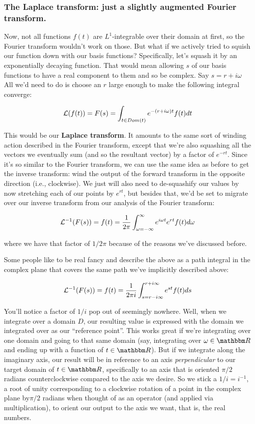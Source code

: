 \documentclass[letterpaper,12pt]{report}
\begin{document}
\subsubsection{The Laplace transform: just a slightly augmented Fourier transform.}

Now, not all functions \(f(t)\)
are \(L^1\)-integrable over their domain
at first, so the Fourier transform wouldn't work on those. 
But what if we actively tried to squish our 
function down with our basis functions? Specifically,
let's squash it by an exponentially decaying function.
That would mean allowing \(s\) of our basis functions 
to have a real component to them and so be complex.
Say \(s = r + i\omega\)
All we'd need to do is choose an \(r\) large enough to
make the following integral converge:

\[ \mathcal{L}(f(t)) = F(s) = \int_{t \in Dom(t)} e^{-(r + i\omega)t} f(t) dt \]

This would be our \textbf{Laplace transform}. It amounts
to the same sort of winding action described in the Fourier
transform, except that we're also squashing all the vectors
we eventually sum (and so the resultant vector)
by a factor of \(e^{-rt}\). Since it's so similar to
the Fourier transform, we can use the same idea as
before to get the inverse transform: wind the output
of the forward transform in the opposite direction
(i.e., clockwise). We just will also need to de-squashify
our values by now stretching each of our points by
\(e^{rt}\), but besides that, we'd be set to migrate
over our inverse transform from our analysis of the Fourier
transform:

\[ \mathcal{L}^{-1}(F(s)) = f(t) = \frac{1}{2\pi} \int_{\omega = -\infty}^{\infty} e^{i\omega t} e^{rt} f(t) d\omega \]

where we have that factor of \(1/2\pi\) because of the reasons
we've discussed before.\par

Some people like to be real fancy and describe the above
as a path integral in the complex plane that covers the
same path we've implicitly described above:

\[ \mathcal{L}^{-1}(F(s)) = f(t) = \frac{1}{2\pi i} \int_{s = r - i\infty}^{r + i\infty} e^{st} f(t) ds \]

You'll notice a factor of \(1/i\) pop out of seemingly
nowhere.
Well, when we integrate over a domain \(D\),
our resulting value is expressed with the domain we integrated
over as our ``reference point''. This works great if
we're integrating over one domain and going to
that same domain (say, integrating over \(\omega \in \domain{R}\)
and ending up with a function of \(t \in \domain{R}\)).
But if we integrate along the imaginary axis, our result
will be in reference to an axis \emph{perpendicular} to
our target domain of \(t \in \domain{R}\), specifically
to an axis that is oriented \(\pi/2\) radians counterclockwise
compared to the axis we desire. So we stick
a \(1/i = i^{-1}\), a root of unity corresponding
to a clockwise rotation of a point in the
complex plane by\(\pi/2\) radians 
when thought of as an operator (and applied via multiplication),
to orient our output to the axis we want, that is, the
real numbers.
\\
\end{document}
